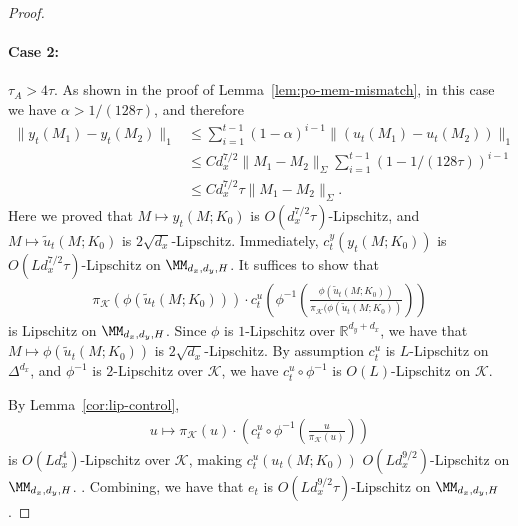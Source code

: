 \begin{proof}
\paragraph{Case 2:} $\tau_A>4\tau$. As shown in the proof of Lemma~\ref{lem:po-mem-mismatch}, in this case we have $\alpha > 1/(128\tau)$, and therefore
\begin{align*}
\|y_t(M_1)-y_t(M_2)\|_1&\le\sum_{i=1}^{t-1}(1-\alpha)^{i-1}\|(u_t(M_1)-u_t(M_2))\|_1\\
&\le Cd_x^{7/2}\|M_1-M_2\|_{\Sigma}\sum_{i=1}^{t-1}(1-1/(128\tau))^{i-1}\\
&\le C d_x^{7/2}\tau\|M_1-M_2\|_{\Sigma}.
\end{align*}
Here we proved that $M\mapsto y_t(M;K_0)$ is $O(d_x^{7/2}\tau)$-Lipschitz, and $M\mapsto \tilde{u}_t(M;K_0)$ is $2\sqrt{d_x}$-Lipschitz. Immediately, $c_t^y(y_t(M;K_0))$ is $O(Ld_x^{7/2}\tau)$-Lipschitz on $\MM_{d_x,d_y,H}$. It suffices to show that
\begin{align*}
\pi_{\mathcal{K}}(\phi(\tilde{u}_t(M;K_0))) \cdot c_t^u(\phi^{-1}(\frac{\phi(\tilde{u}_t(M;K_0))}{\pi_{\mathcal{K}}(\phi(\tilde{u}_t(M;K_0))}))
\end{align*}
is Lipschitz on $\MM_{d_x,d_y,H}$. Since $\phi$ is $1$-Lipschitz over $\mathbb{R}^{d_y+d_x}$, we have that $M\mapsto \phi(\tilde{u}_t(M;K_0))$ is $2\sqrt{d_x}$-Lipschitz. By assumption $c_t^{u}$ is $L$-Lipschitz on $\Delta^{d_x}$, and $\phi^{-1}$ is $2$-Lipschitz over $\mathcal{K}$, we have $c_t^{u}\circ\phi^{-1}$ is $O(L)$-Lipschitz on $\mathcal{K}$. 

By Lemma~\ref{cor:lip-control}, 
\begin{align*}
u\mapsto \pi_{\mathcal{K}}(u)\cdot \left(c_t^u\circ\phi^{-1} \left(\frac{u}{\pi_{\mathcal{K}}(u)}\right)\right)
\end{align*}
is $O(Ld_x^{4})$-Lipschitz over $\mathcal{K}$, making $c_t^u(u_t(M;K_0))$ $O(Ld_x^{9/2})$-Lipschitz on $\MM_{d_x,d_y,H}$.  . Combining, we have that $e_t$ is $O(Ld_x^{9/2}\tau)$-Lipschitz on $\MM_{d_x,d_y,H}$.  
\end{proof}

